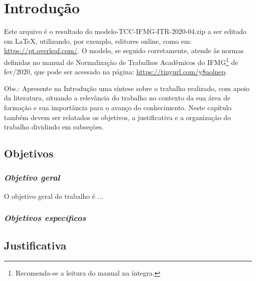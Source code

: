 \chapter{Introdução} \label{Introducao}

Este arquivo é o resultado do modelo-TCC-IFMG-ITR-2020-04.zip a ser editado em LaTeX, utilizando, por exemplo, editores online, como em: \url{https://pt.overleaf.com/}. O modelo, se seguido corretamente, atende às normas definidas no manual de Normalização de Trabalhos Acadêmicos do IFMG\footnote{Recomenda-se a leitura do manual na íntegra.} de fev/2020, que pode ser acessado na página: \url{https://tinyurl.com/y8aolnep}. 

Obs.: Apresente na Introdução uma síntese sobre o trabalho realizado, com apoio da literatura, situando a relevância do trabalho no contexto da sua área de formação e sua importância para o avanço do conhecimento. Neste capítulo também devem ser relatados os objetivos, a justificativa e a organização do trabalho dividindo em subseções. 


\section{Objetivos}

\subsection{\textit{Objetivo geral}}

O objetivo geral do trabalho é ...

\subsection{\textit{Objetivos específicos}}

\section{Justificativa}

